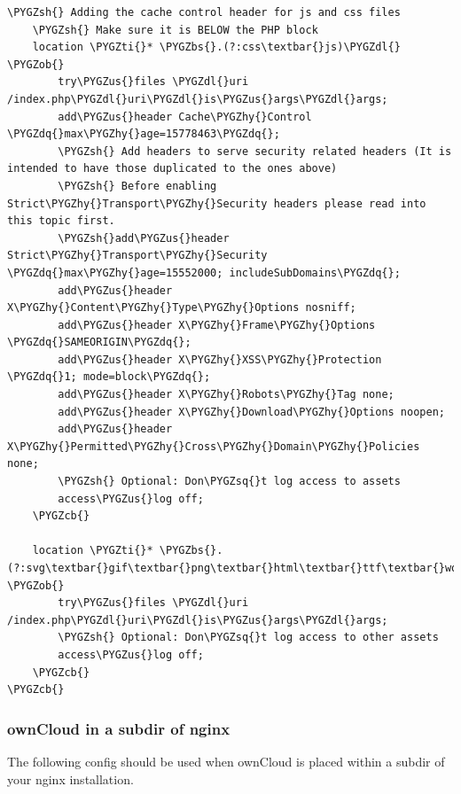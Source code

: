 \documentclass[letterpaper,10pt,english]{sphinxmanual}
\def\PYGZbs{\char`\\}
\def\PYGZus{\char`\_}
\def\PYGZob{\char`\{}
\def\PYGZcb{\char`\}}
\def\PYGZsh{\char`\#}
\def\PYGZdl{\char`\$}
\def\PYGZhy{\char`\-}
\def\PYGZsq{\char`\'}
\def\PYGZdq{\char`\"}
\def\PYGZti{\char`\~}
\renewcommand\PYGZsq{\textquotesingle}
\begin{document}
\begin{Verbatim}[commandchars=\\\{\}]
    \PYGZsh{} Adding the cache control header for js and css files
    \PYGZsh{} Make sure it is BELOW the PHP block
    location \PYGZti{}* \PYGZbs{}.(?:css\textbar{}js)\PYGZdl{} \PYGZob{}
        try\PYGZus{}files \PYGZdl{}uri /index.php\PYGZdl{}uri\PYGZdl{}is\PYGZus{}args\PYGZdl{}args;
        add\PYGZus{}header Cache\PYGZhy{}Control \PYGZdq{}max\PYGZhy{}age=15778463\PYGZdq{};
        \PYGZsh{} Add headers to serve security related headers (It is intended to have those duplicated to the ones above)
        \PYGZsh{} Before enabling Strict\PYGZhy{}Transport\PYGZhy{}Security headers please read into this topic first.
        \PYGZsh{}add\PYGZus{}header Strict\PYGZhy{}Transport\PYGZhy{}Security \PYGZdq{}max\PYGZhy{}age=15552000; includeSubDomains\PYGZdq{};
        add\PYGZus{}header X\PYGZhy{}Content\PYGZhy{}Type\PYGZhy{}Options nosniff;
        add\PYGZus{}header X\PYGZhy{}Frame\PYGZhy{}Options \PYGZdq{}SAMEORIGIN\PYGZdq{};
        add\PYGZus{}header X\PYGZhy{}XSS\PYGZhy{}Protection \PYGZdq{}1; mode=block\PYGZdq{};
        add\PYGZus{}header X\PYGZhy{}Robots\PYGZhy{}Tag none;
        add\PYGZus{}header X\PYGZhy{}Download\PYGZhy{}Options noopen;
        add\PYGZus{}header X\PYGZhy{}Permitted\PYGZhy{}Cross\PYGZhy{}Domain\PYGZhy{}Policies none;
        \PYGZsh{} Optional: Don\PYGZsq{}t log access to assets
        access\PYGZus{}log off;
    \PYGZcb{}

    location \PYGZti{}* \PYGZbs{}.(?:svg\textbar{}gif\textbar{}png\textbar{}html\textbar{}ttf\textbar{}woff\textbar{}ico\textbar{}jpg\textbar{}jpeg)\PYGZdl{} \PYGZob{}
        try\PYGZus{}files \PYGZdl{}uri /index.php\PYGZdl{}uri\PYGZdl{}is\PYGZus{}args\PYGZdl{}args;
        \PYGZsh{} Optional: Don\PYGZsq{}t log access to other assets
        access\PYGZus{}log off;
    \PYGZcb{}
\PYGZcb{}
\end{Verbatim}


\subsubsection{ownCloud in a subdir of nginx}
\label{installation/nginx_examples:owncloud-in-a-subdir-of-nginx}
The following config should be used when ownCloud is placed within a subdir of
your nginx installation.
\end{document}
